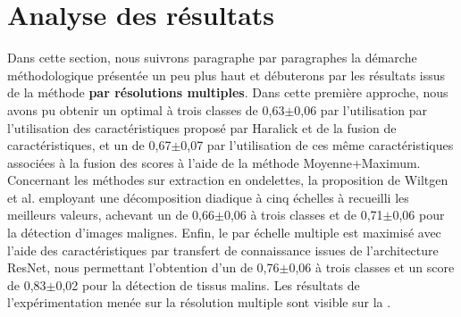 \section{Analyse des résultats}
Dans cette section, nous suivrons paragraphe par paragraphes la démarche méthodologique présentée un peu plus haut et débuterons par les résultats issus de la méthode \textbf{par résolutions multiples}. Dans cette première approche, nous avons pu obtenir un \fscore optimal à trois classes de 0,63$\pm$0,06 par l'utilisation par l'utilisation des caractéristiques proposé par Haralick et de la fusion de caractéristiques, et un \fscore de 0,67$\pm$0,07 par l'utilisation de ces même caractéristiques associées à la fusion des scores à l'aide de la méthode Moyenne+Maximum. Concernant les méthodes sur extraction en ondelettes, la proposition de Wiltgen et al.\cite{Wiltgen2008} employant une décomposition diadique à cinq échelles à recueilli les meilleurs valeurs, achevant un \fscore de 0,66$\pm$0,06 à trois classes et de 0,71$\pm$0,06 pour la détection d'images malignes. Enfin, le \fscore par échelle multiple est maximisé avec l'aide des caractéristiques par transfert de connaissance issues de l'architecture ResNet, nous permettant l'obtention d'un \fscore de 0,76$\pm$0,06 à trois classes et un score de 0,83$\pm$0,02 pour la détection de tissus malins. Les résultats de l'expérimentation menée sur la résolution multiple sont visible sur la .\par

